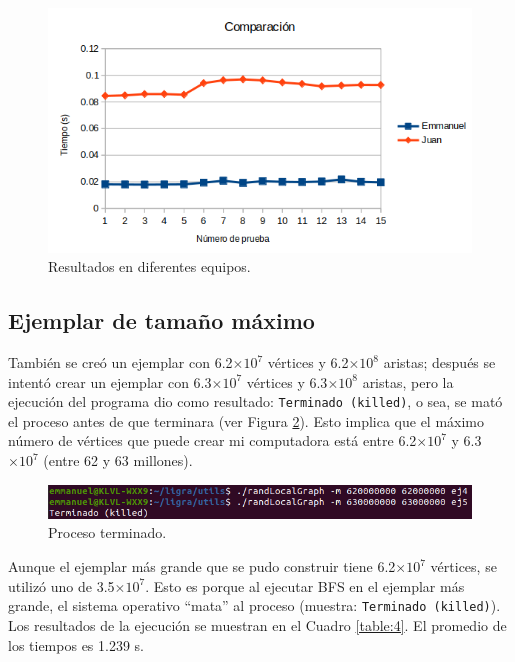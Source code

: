 \documentclass{article}
\begin{document}
\begin{figure}[htbp]

\center

\includegraphics[scale=0.5]{imagenes/comparacion}

\caption{Resultados en diferentes equipos.} \label{fig:compa}

\end{figure}

\subsection{Ejemplar de tamaño máximo}

También se creó un ejemplar con 6.2$\times 10^7$ vértices y 6.2$\times 10^8$ aristas; después se intentó crear un ejemplar con 6.3$\times 10^7$ vértices y 6.3$\times 10^8$ aristas, pero la ejecución del programa dio como resultado: \texttt{Terminado (killed)}, o sea, se mató el proceso antes de que terminara (ver Figura \ref{fig:killed}). Esto implica que el máximo número de vértices que puede crear mi computadora está entre 6.2$\times 10^7$ y 6.3$\times 10^7$ (entre 62 y 63 millones).

\begin{figure}[htbp]

\center

\includegraphics[width=\linewidth]{imagenes/limite2}

\caption{Proceso terminado.} \label{fig:killed}

\end{figure}

Aunque el ejemplar más grande que se pudo construir tiene 6.2$\times 10^7$ vértices, se utilizó uno de 3.5$\times 10^7$. Esto es porque al ejecutar BFS en el ejemplar más grande, el sistema operativo ``mata'' al proceso (muestra: \texttt{Terminado (killed)}). Los resultados de la ejecución se muestran en el Cuadro \ref{table:4}. El promedio de los tiempos es 1.239 s.
\end{document}
